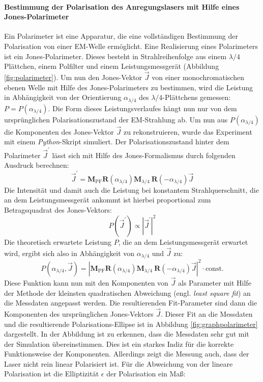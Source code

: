 \documentclass[titlepage,  ngerman]{article}
\begin{document}
	\paragraph{Bestimmung der Polarisation des Anregungslasers mit Hilfe eines Jones-Polarimeter}
	Ein Polarimeter ist eine Apparatur, die eine vollständigen Bestimmung der Polarisation von einer EM-Welle ermöglicht. Eine Realisierung eines Polarimeters ist ein Jones-Polarimeter. Dieses besteht in Strahlreihenfolge aus einem $\lambda / 4$ Plättchen, einem Polfilter und einem Leistungsmessgerät (Abbildung \ref{fig:polarimeter}). Um nun den Jones-Vektor $\vec{J}$ von einer monochromatischen ebenen Welle mit Hilfe des Jones-Polarimeters zu bestimmen, wird die Leistung in Abhängigkeit von der Orientierung $\alpha_{\lambda/4}$ des $\lambda / 4$-Plättchens gemessen: $P = P(\alpha_{\lambda/4})$. Die Form dieses Leistungsverlaufes hängt nun nur von dem ursprünglichen Polarisationszustand der EM-Strahlung ab. Um nun aus $P(\alpha_{\lambda/4})$ die Komponenten des Jones-Vektor $\vec{J}$ zu rekonstruieren, wurde das Experiment mit einem \textit{Python}-Skript simuliert. Der Polarisationszustand hinter dem Polarimeter $\vec{J}^\prime$ lässt sich mit Hilfe des Jones-Formalismus durch folgenden Ausdruck berechnen:
	\begin{equation}
		\vec{J}^\prime = \boldsymbol{M}_\mathrm{PF} \boldsymbol{R}(\alpha_{\lambda/4})\boldsymbol{M}_{\lambda / 4}\ \boldsymbol{R}(-\alpha_{\lambda/4})\vec{J}
	\end{equation}
	Die Intensität und damit auch die Leistung bei konstantem Strahlquerschnitt, die an dem Leistungsmessgerät ankommt ist hierbei proportional zum Betragsquadrat des Jones-Vektors:
	\begin{equation}
		P(\vec{J}^\prime) \propto \left|\vec{J}^\prime\right|^2
	\end{equation}
	Die theoretisch erwartete Leistung $P$, die an dem Leistungsmessgerät erwartet wird, ergibt sich also in Abhängigkeit von $\alpha_{\lambda/4}$ und $\vec{J}$ zu:
	\begin{equation}
		P(\alpha_{\lambda/4}, \vec{J}) = \left|\boldsymbol{M}_\mathrm{PF} \boldsymbol{R}(\alpha_{\lambda/4})\boldsymbol{M}_{\lambda / 4}\ \boldsymbol{R}(-\alpha_{\lambda/4})\vec{J}\right|^2 \cdot \mathrm{const.}
		\label{eq:simulation_polarimeter}
	\end{equation}
	Diese Funktion kann nun mit den Komponenten von $\vec{J}$ als Parameter mit Hilfe der Methode der kleinsten quadratischen Abweichung (engl. \textit{least square fit}) an die Messdaten angepasst werden. Die resultierenden Fit-Parameter sind dann die Komponenten des ursprünglichen Jones-Vektors $\vec{J}$. Dieser Fit an die Messdaten und die resultierende Polarisations-Ellipse ist in Abbildung \ref{fig:graphpolarimeter} dargestellt. In der Abbildung ist zu erkennen, dass die Messdaten sehr gut mit der Simulation übereinstimmen. Dies ist ein starkes Indiz für die korrekte Funktionsweise der Komponenten. Allerdings zeigt die Messung auch, dass der Laser nicht rein linear Polarisiert ist. Für die Abweichung von der lineare Polarisation ist die Elliptizität $\epsilon$ der Polarisation ein Maß:
\end{document}
